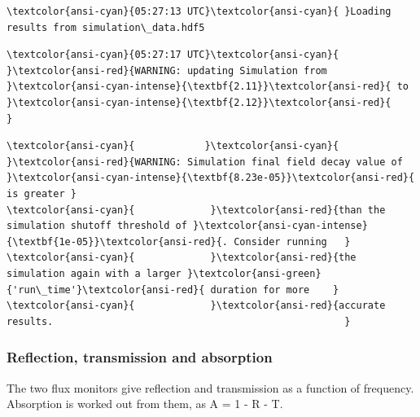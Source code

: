 \documentclass[11pt]{article}
\begin{document}
    
    
    \begin{Verbatim}[commandchars=\\\{\}]
\textcolor{ansi-cyan}{05:27:13 UTC}\textcolor{ansi-cyan}{ }Loading results from simulation\_data.hdf5                          

    \end{Verbatim}

    
    
    \begin{Verbatim}[commandchars=\\\{\}]
\textcolor{ansi-cyan}{05:27:17 UTC}\textcolor{ansi-cyan}{ }\textcolor{ansi-red}{WARNING: updating Simulation from }\textcolor{ansi-cyan-intense}{\textbf{2.11}}\textcolor{ansi-red}{ to }\textcolor{ansi-cyan-intense}{\textbf{2.12}}\textcolor{ansi-red}{                     }

    \end{Verbatim}

    
    
    \begin{Verbatim}[commandchars=\\\{\}]
\textcolor{ansi-cyan}{            }\textcolor{ansi-cyan}{ }\textcolor{ansi-red}{WARNING: Simulation final field decay value of }\textcolor{ansi-cyan-intense}{\textbf{8.23e-05}}\textcolor{ansi-red}{ is greater }
\textcolor{ansi-cyan}{             }\textcolor{ansi-red}{than the simulation shutoff threshold of }\textcolor{ansi-cyan-intense}{\textbf{1e-05}}\textcolor{ansi-red}{. Consider running   }
\textcolor{ansi-cyan}{             }\textcolor{ansi-red}{the simulation again with a larger }\textcolor{ansi-green}{'run\_time'}\textcolor{ansi-red}{ duration for more    }
\textcolor{ansi-cyan}{             }\textcolor{ansi-red}{accurate results.                                                  }

    \end{Verbatim}

    
    \subsubsection{Reflection, transmission and
absorption}\label{reflection-transmission-and-absorption}

The two flux monitors give reflection and transmission as a function of
frequency. Absorption is worked out from them, as A = 1 - R - T.
\end{document}
